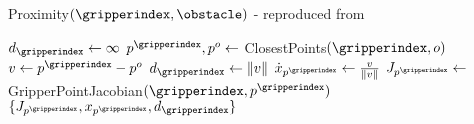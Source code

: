 \begin{algorithm}[t]
    \caption{Proximity$(\gripperindex, \obstacle)$ - reproduced from~\cite{Berenson2013}}
    \label{alg:proximity}
    \begin{algorithmic}[1]
        \State $d_\gripperindex \gets \infty$
            \State $p^\gripperindex, p^o \gets$ ClosestPoints$(\gripperindex, o)$
            \State $v \gets p^\gripperindex - p^o$
                \State $d_\gripperindex \gets \| v \|$
                \State $\dot x_{p^\gripperindex} \gets \frac{v}{\| v \|}$
                \State $J_{p^\gripperindex} \gets$ GripperPointJacobian$(\gripperindex, p^\gripperindex)$
            \EndIf
        \EndFor
        \State \Return $\{J_{p^\gripperindex}, x_{p^\gripperindex}, d_\gripperindex \}$
    \end{algorithmic}
\end{algorithm}